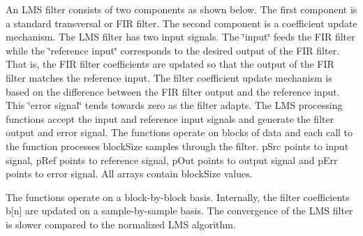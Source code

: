 An L\+MS filter consists of two components as shown below. The first component is a standard transversal or F\+IR filter. The second component is a coefficient update mechanism. The L\+MS filter has two input signals. The \char`\"{}input\char`\"{} feeds the F\+IR filter while the \char`\"{}reference input\char`\"{} corresponds to the desired output of the F\+IR filter. That is, the F\+IR filter coefficients are updated so that the output of the F\+IR filter matches the reference input. The filter coefficient update mechanism is based on the difference between the F\+IR filter output and the reference input. This \char`\"{}error signal\char`\"{} tends towards zero as the filter adapts. The L\+MS processing functions accept the input and reference input signals and generate the filter output and error signal.  The functions operate on blocks of data and each call to the function processes {\ttfamily block\+Size} samples through the filter. {\ttfamily p\+Src} points to input signal, {\ttfamily p\+Ref} points to reference signal, {\ttfamily p\+Out} points to output signal and {\ttfamily p\+Err} points to error signal. All arrays contain {\ttfamily block\+Size} values.

The functions operate on a block-\/by-\/block basis. Internally, the filter coefficients {\ttfamily b\mbox{[}n\mbox{]}} are updated on a sample-\/by-\/sample basis. The convergence of the L\+MS filter is slower compared to the normalized L\+MS algorithm.

